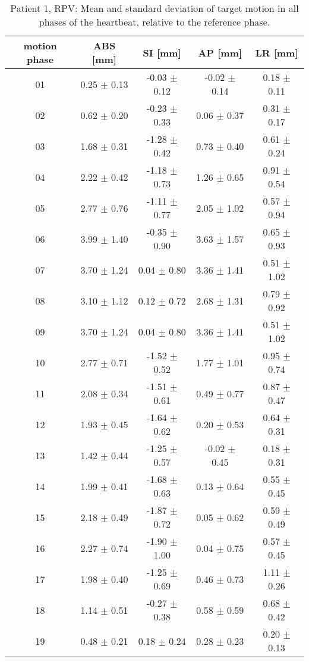 \begin{table}[htbp]
  \centering
  \tiny
  \caption{Patient 1, RPV: Mean and standard deviation of target motion in all phases of the heartbeat, relative to the reference phase.}
  \begin{tabular}{|c|c|c|c|c|}
    \hline\hline
    motion phase\rule{0pt}{2.6ex}\rule[-1.2ex]{0pt}{0pt} & ABS [mm] & SI [mm] & AP [mm] & LR [mm]\\
    \hline
01& 0.25 $\pm$ 0.13& -0.03 $\pm$ 0.12& -0.02 $\pm$ 0.14& 0.18 $\pm$ 0.11 \\
02& 0.62 $\pm$ 0.20& -0.23 $\pm$ 0.33& 0.06 $\pm$ 0.37& 0.31 $\pm$ 0.17 \\
03& 1.68 $\pm$ 0.31& -1.28 $\pm$ 0.42& 0.73 $\pm$ 0.40& 0.61 $\pm$ 0.24 \\
04& 2.22 $\pm$ 0.42& -1.18 $\pm$ 0.73& 1.26 $\pm$ 0.65& 0.91 $\pm$ 0.54 \\
05& 2.77 $\pm$ 0.76& -1.11 $\pm$ 0.77& 2.05 $\pm$ 1.02& 0.57 $\pm$ 0.94 \\
06& 3.99 $\pm$ 1.40& -0.35 $\pm$ 0.90& 3.63 $\pm$ 1.57& 0.65 $\pm$ 0.93 \\
07& 3.70 $\pm$ 1.24& 0.04 $\pm$ 0.80& 3.36 $\pm$ 1.41& 0.51 $\pm$ 1.02 \\
08& 3.10 $\pm$ 1.12& 0.12 $\pm$ 0.72& 2.68 $\pm$ 1.31& 0.79 $\pm$ 0.92 \\
09& 3.70 $\pm$ 1.24& 0.04 $\pm$ 0.80& 3.36 $\pm$ 1.41& 0.51 $\pm$ 1.02 \\
10& 2.77 $\pm$ 0.71& -1.52 $\pm$ 0.52& 1.77 $\pm$ 1.01& 0.95 $\pm$ 0.74 \\
11& 2.08 $\pm$ 0.34& -1.51 $\pm$ 0.61& 0.49 $\pm$ 0.77& 0.87 $\pm$ 0.47 \\
12& 1.93 $\pm$ 0.45& -1.64 $\pm$ 0.62& 0.20 $\pm$ 0.53& 0.64 $\pm$ 0.31 \\
13& 1.42 $\pm$ 0.44& -1.25 $\pm$ 0.57& -0.02 $\pm$ 0.45& 0.18 $\pm$ 0.31 \\
14& 1.99 $\pm$ 0.41& -1.68 $\pm$ 0.63& 0.13 $\pm$ 0.64& 0.55 $\pm$ 0.45 \\
15& 2.18 $\pm$ 0.49& -1.87 $\pm$ 0.72& 0.05 $\pm$ 0.62& 0.59 $\pm$ 0.49 \\
16& 2.27 $\pm$ 0.74& -1.90 $\pm$ 1.00& 0.04 $\pm$ 0.75& 0.57 $\pm$ 0.45 \\
17& 1.98 $\pm$ 0.40& -1.25 $\pm$ 0.69& 0.46 $\pm$ 0.73& 1.11 $\pm$ 0.26 \\
18& 1.14 $\pm$ 0.51& -0.27 $\pm$ 0.38& 0.58 $\pm$ 0.59& 0.68 $\pm$ 0.42 \\ 
19& 0.48 $\pm$ 0.21& 0.18 $\pm$ 0.24& 0.28 $\pm$ 0.23& 0.20 $\pm$ 0.13 \\
    \hline\hline
  \end{tabular}
\end{table}


